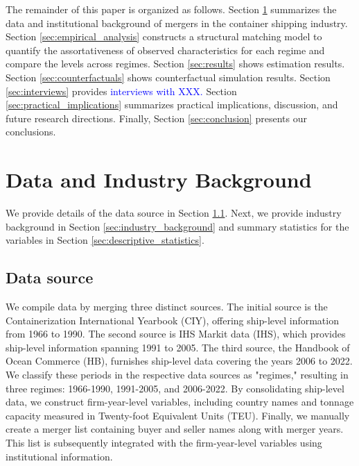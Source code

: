 \documentclass[10pt]{article}
\begin{document}
The remainder of this paper is organized as follows. 
Section \ref{sec:data_and_institutional_background} summarizes the data and institutional background of mergers in the container shipping industry.
Section \ref{sec:empirical_analysis} constructs a structural matching model to quantify the assortativeness of observed characteristics for each regime and compare the levels across regimes.
Section \ref{sec:results} shows estimation results.
Section \ref{sec:counterfactuals} shows counterfactual simulation results.
Section \ref{sec:interviews} provides \textcolor{blue}{interviews with XXX.}
Section \ref{sec:practical_implications} summarizes practical implications, discussion, and future research directions.
Finally, Section \ref{sec:conclusion} presents our conclusions.


\section{Data and Industry Background}\label{sec:data_and_institutional_background}
We provide details of the data source in Section \ref{sec:data_source}. 
Next, we provide industry background in
Section \ref{sec:industry_background} and summary statistics for the variables in Section \ref{sec:descriptive_statistics}.




\subsection{Data source}\label{sec:data_source}
We compile data by merging three distinct sources.
The initial source is the Containerization International Yearbook (CIY), offering ship-level information from 1966 to 1990. 
The second source is IHS Markit data (IHS), which provides ship-level information spanning 1991 to 2005. 
The third source, the Handbook of Ocean Commerce (HB), furnishes ship-level data covering the years 2006 to 2022.
We classify these periods in the respective data sources as "regimes," resulting in three regimes: 1966-1990, 1991-2005, and 2006-2022.
By consolidating ship-level data, we construct firm-year-level variables, including country names and tonnage capacity measured in Twenty-foot Equivalent Units (TEU).
Finally, we manually create a merger list containing buyer and seller names along with merger years. 
This list is subsequently integrated with the firm-year-level variables using institutional information.
\end{document}
